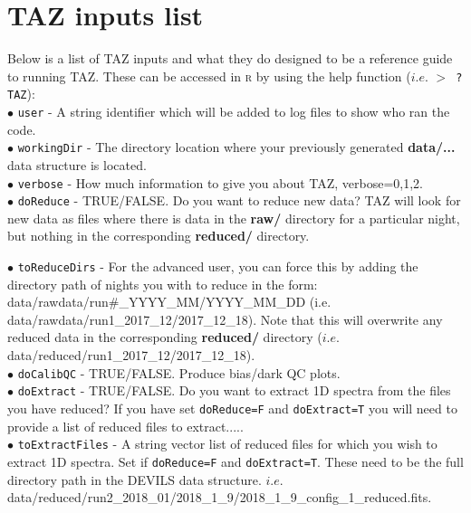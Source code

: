 \documentclass[12pt]{article}
\begin{document}
\section{TAZ inputs list}

Below is a list of TAZ inputs and what they do designed to be a reference guide to running TAZ. These can be accessed in \textsc{r} by using the help function ($i.e.$ \texttt{$>$ ?TAZ}):\\


$\bullet$ \texttt{user} - A string identifier which will be added to log files to show who ran the code. \\

$\bullet$ \texttt{workingDir} - The directory location where your previously generated \textbf{data/...} data structure is located.\\

$\bullet$ \texttt{verbose} - How much information to give you about TAZ,  verbose=0,1,2.\\

$\bullet$ \texttt{doReduce} - TRUE/FALSE. Do you want to reduce new data? TAZ will look for new data as files where there is data in the \textbf{raw/} directory for a particular night, but nothing in the corresponding \textbf{reduced/} directory. 

$\bullet$ \texttt{toReduceDirs}  - For the advanced user, you can force this by adding the directory path of nights you with to reduce in the form: data/rawdata/run\#\_YYYY\_MM/YYYY\_MM\_DD (i.e. data/rawdata/run1\_2017\_12/2017\_12\_18). Note that this will overwrite any reduced data in the corresponding \textbf{reduced/} directory ($i.e.$ data/reduced/run1\_2017\_12/2017\_12\_18).    \\

$\bullet$ \texttt{doCalibQC} - TRUE/FALSE. Produce bias/dark QC plots.\\

$\bullet$ \texttt{doExtract} - TRUE/FALSE. Do you want to extract 1D spectra from the files you have reduced? If you have set \texttt{doReduce=F} and \texttt{doExtract=T} you will need to provide a list of reduced files to extract..... \\

$\bullet$ \texttt{toExtractFiles} - A string vector list of reduced files for which you wish to extract 1D spectra. Set if \texttt{doReduce=F} and \texttt{doExtract=T}. These need to be the full directory path in the DEVILS data structure. $i.e.$ data/reduced/run2\_2018\_01/2018\_1\_9/2018\_1\_9\_config\_1\_reduced.fits. \\
\end{document}
